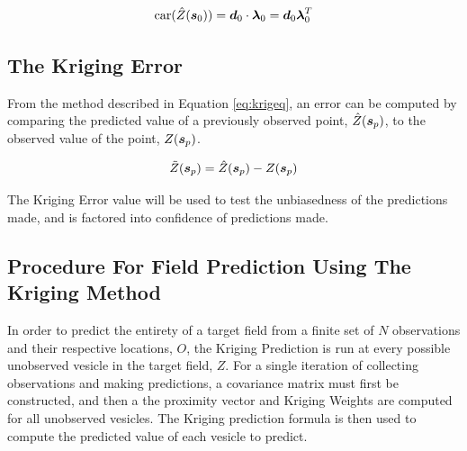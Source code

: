 \begin{equation}
    \text{car}(\hat{Z}({\it{\boldsymbol{s}}}_0)) = {\it{\boldsymbol{d}}}_0 \cdot {\it{\boldsymbol{\lambda}}}_0 = {\it{\boldsymbol{d}}}_0 {\it{\boldsymbol{\lambda}}}_0^T
\end{equation}

\subsection{The Kriging Error}
From the method described in Equation \ref{eq:krigeq}, an error can be computed by comparing the predicted value of a previously observed point, $\hat{Z}({\it{\boldsymbol{s}}}_p)$, to the observed value of the point, $Z({\it{\boldsymbol{s}}}_p)$.

\begin{equation}
    \tilde{Z}({\it{\boldsymbol{s}}}_p) = \hat{Z}({\it{\boldsymbol{s}}}_p) - Z({\it{\boldsymbol{s}}}_p) 
    \label{eq:krigerr}
\end{equation}

The Kriging Error value will be used to test the unbiasedness of the predictions made, and is factored into confidence of predictions made.

\subsection{Procedure For Field Prediction Using The Kriging Method}
In order to predict the entirety of a target field from a finite set of $N$ observations and their respective locations, $O$, the Kriging Prediction is run at every possible unobserved vesicle in the target field, $Z$. For a single iteration of collecting observations and making predictions, a covariance matrix must first be constructed, and then a the proximity vector and Kriging Weights are computed for all unobserved vesicles. The Kriging prediction formula is then used to compute the predicted value of each vesicle to predict.


